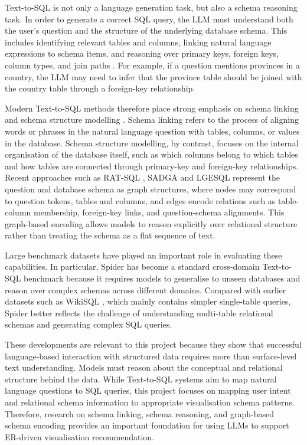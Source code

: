 Text-to-SQL is not only a language generation task, but also a schema reasoning task. In order to generate a correct SQL query, the LLM must understand both the user's question and the structure of the underlying database schema. This includes identifying relevant tables and columns, linking natural language expressions to schema items, and reasoning over primary keys, foreign keys, column types, and join paths \cite{qin2022survey}. For example, if a question mentions provinces in a country, the LLM may need to infer that the province table should be joined with the country table through a foreign-key relationship.

Modern Text-to-SQL methods therefore place strong emphasis on schema linking and schema structure modelling \cite{qin2022survey}. Schema linking refers to the process of aligning words or phrases in the natural language question with tables, columns, or values in the database. Schema structure modelling, by contrast, focuses on the internal organisation of the database itself, such as which columns belong to which tables and how tables are connected through primary-key and foreign-key relationships. Recent approaches such as RAT-SQL \cite{wang2020rat}, SADGA \cite{cai2021sadga} and LGESQL \cite{cao2021lgesql} represent the question and database schema as graph structures, where nodes may correspond to question tokens, tables and columns, and edges encode relations such as table-column membership, foreign-key links, and question-schema alignments. This graph-based encoding allows models to reason explicitly over relational structure rather than treating the schema as a flat sequence of text.

Large benchmark datasets have played an important role in evaluating these capabilities. In particular, Spider \cite{yu2018spider} has become a standard cross-domain Text-to-SQL benchmark because it requires models to generalise to unseen databases and reason over complex schemas across different domains. Compared with earlier datasets such as WikiSQL \cite{zhong2017seq2sql}, which mainly contains simpler single-table queries, Spider better reflects the challenge of understanding multi-table relational schemas and generating complex SQL queries.

These developments are relevant to this project because they show that successful language-based interaction with structured data requires more than surface-level text understanding. Models must reason about the conceptual and relational structure behind the data. While Text-to-SQL systems aim to map natural language questions to SQL queries, this project focuses on mapping user intent and relational schema information to appropriate visualisation schema patterns. Therefore, research on schema linking, schema reasoning, and graph-based schema encoding provides an important foundation for using LLMs to support ER-driven visualisation recommendation.

